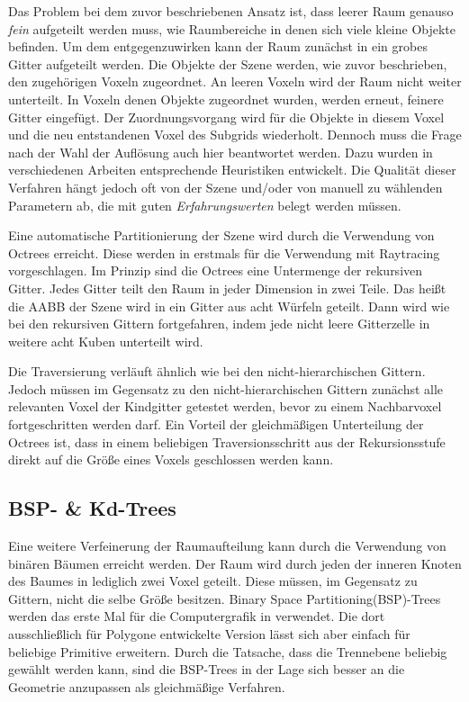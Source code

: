 Das Problem bei dem zuvor beschriebenen Ansatz ist, dass leerer Raum genauso \textit{fein} aufgeteilt werden muss, wie Raumbereiche in denen sich viele kleine Objekte befinden. Um dem entgegenzuwirken kann der Raum zunächst in ein grobes Gitter aufgeteilt werden. Die Objekte der Szene werden, wie zuvor beschrieben, den zugehörigen Voxeln zugeordnet. An leeren Voxeln wird der Raum nicht weiter unterteilt. In Voxeln denen Objekte zugeordnet wurden, werden erneut, feinere Gitter eingefügt. Der Zuordnungsvorgang wird für die Objekte in diesem Voxel und die neu entstandenen Voxel des Subgrids wiederholt.
Dennoch muss die Frage nach der Wahl der Auflösung auch hier beantwortet werden. Dazu wurden in verschiedenen Arbeiten entsprechende Heuristiken entwickelt. Die Qualität dieser Verfahren hängt jedoch oft von der Szene und/oder von manuell zu wählenden Parametern ab, die mit guten \textit{Erfahrungswerten} belegt werden müssen.

Eine automatische Partitionierung der Szene wird durch die Verwendung von Octrees erreicht. Diese werden in \cite{Glassner88} erstmals für die Verwendung mit Raytracing vorgeschlagen. Im Prinzip sind die Octrees eine Untermenge der rekursiven Gitter. Jedes Gitter teilt den Raum in jeder Dimension in zwei Teile. Das heißt die AABB der Szene wird in ein Gitter aus acht Würfeln geteilt. Dann wird wie bei den rekursiven Gittern fortgefahren, indem jede nicht leere Gitterzelle in weitere acht Kuben unterteilt wird.

Die Traversierung verläuft ähnlich wie bei den nicht-hierarchischen Gittern. Jedoch müssen im Gegensatz zu den nicht-hierarchischen Gittern zunächst alle relevanten Voxel der Kindgitter getestet werden, bevor zu einem Nachbarvoxel fortgeschritten werden darf. Ein Vorteil der gleichmäßigen Unterteilung der Octrees ist, dass in einem beliebigen Traversionsschritt aus der Rekursionsstufe direkt auf die Größe eines Voxels geschlossen werden kann.

\subsection{BSP- \& Kd-Trees}

Eine weitere Verfeinerung der Raumaufteilung kann durch die Verwendung von binären Bäumen erreicht werden. Der Raum wird durch jeden der inneren Knoten des Baumes in lediglich zwei Voxel geteilt. Diese müssen, im Gegensatz zu Gittern, nicht die selbe Größe besitzen. Binary Space Partitioning(BSP)-Trees werden das erste Mal für die Computergrafik in \cite{Fuchs80} verwendet. Die dort ausschließlich für Polygone entwickelte Version lässt sich aber einfach für beliebige Primitive erweitern. Durch die Tatsache, dass die Trennebene beliebig gewählt werden kann, sind die BSP-Trees in der Lage sich besser an die Geometrie anzupassen als gleichmäßige Verfahren.

